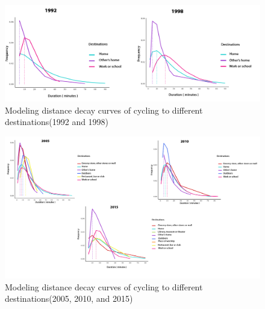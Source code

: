 \documentclass[
11pt, %
oneside, %
english, %
singlespacing, %
]{macthesis} %
\begin{document}
\newpage
\thispagestyle{empty}
\begin{landscape}
\begin{figure}

{\centering \includegraphics[width=0.9\linewidth]{figure/ch03-Fig19} 

}

\caption{Modeling distance decay curves of cycling to different destinations(1992 and 1998)}\label{fig:imp-c1}
\end{figure}

\begin{figure}

{\centering \includegraphics[width=0.9\linewidth]{figure/ch03-Fig20} 

}

\caption{Modeling distance decay curves of cycling to different destinations(2005, 2010, and 2015)}\label{fig:imp-c2}
\end{figure}

\end{landscape}
\clearpage
\end{document}
